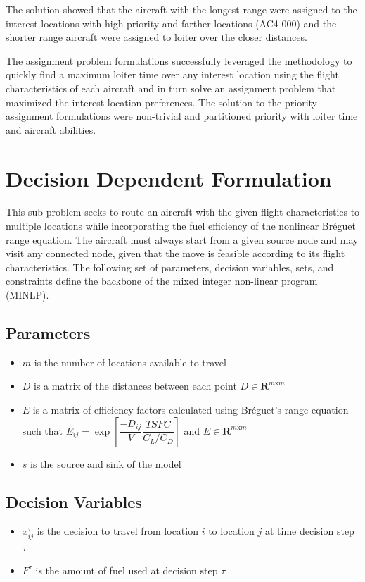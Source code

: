 The solution showed that the aircraft with the longest range were assigned to the interest locations with high priority and farther locations (AC4-000) and the shorter range aircraft were assigned to loiter over the closer distances. \par 
The assignment problem formulations successfully leveraged the methodology to quickly find a maximum loiter time over any interest location using the flight characteristics of each aircraft and in turn solve an assignment problem that maximized the interest location preferences. The solution to the priority assignment formulations were non-trivial and partitioned priority with loiter time and aircraft abilities.

\section{Decision Dependent Formulation}
\label{section:DDF}
This sub-problem seeks to route an aircraft with the given flight characteristics to multiple locations while incorporating the fuel efficiency of the nonlinear Br\'eguet range equation. The aircraft must always start from a given source node and may visit any connected node, given that the move is feasible according to its flight characteristics. The following set of parameters, decision variables, sets, and constraints define the backbone of the mixed integer non-linear program (MINLP).
\subsection*{Parameters}
\begin{itemize}
    \item $m$ is the number of locations available to travel
    \item $D$ is a matrix of the distances between each point $D\in \mathbf{R}^{m\text{x}m}$
    \item $E$ is a matrix of efficiency factors calculated using Br\'eguet's range equation such that $E_{ij} = \exp\left[\dfrac{-D_{ij}}{V}\dfrac{TSFC}{C_L/C_D}\right]$ and $E\in \mathbf{R}^{m\text{x}m}$
    \item $s$ is the source and sink of the model
\end{itemize}
\subsection*{Decision Variables}
\begin{itemize}
    \item $x_{ij}^{\tau}$ is the decision to travel from location $i$ to location $j$ at time decision step $\tau$
    \item $F^{\tau}$ is the amount of fuel used at decision step $\tau$
\end{itemize}
